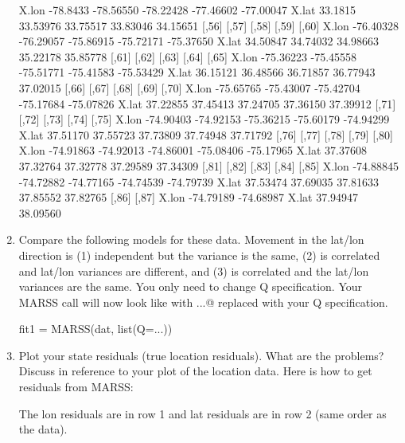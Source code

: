 \begin{hwenumerate}
\begin{enumerate}[label=\alph*)]
\begin{Schunk}
\begin{Soutput}
         [,51]     [,52]     [,53]     [,54]     [,55]
X.lon -78.8433 -78.56550 -78.22428 -77.46602 -77.00047
X.lat  33.1815  33.53976  33.75517  33.83046  34.15651
          [,56]     [,57]     [,58]     [,59]     [,60]
X.lon -76.40328 -76.29057 -75.86915 -75.72171 -75.37650
X.lat  34.50847  34.74032  34.98663  35.22178  35.85778
          [,61]     [,62]     [,63]     [,64]     [,65]
X.lon -75.36223 -75.45558 -75.51771 -75.41583 -75.53429
X.lat  36.15121  36.48566  36.71857  36.77943  37.02015
          [,66]     [,67]     [,68]     [,69]     [,70]
X.lon -75.65765 -75.43007 -75.42704 -75.17684 -75.07826
X.lat  37.22855  37.45413  37.24705  37.36150  37.39912
          [,71]     [,72]     [,73]     [,74]     [,75]
X.lon -74.90403 -74.92153 -75.36215 -75.60179 -74.94299
X.lat  37.51170  37.55723  37.73809  37.74948  37.71792
          [,76]     [,77]     [,78]     [,79]     [,80]
X.lon -74.91863 -74.92013 -74.86001 -75.08406 -75.17965
X.lat  37.37608  37.32764  37.32778  37.29589  37.34309
          [,81]     [,82]     [,83]     [,84]     [,85]
X.lon -74.88845 -74.72882 -74.77165 -74.74539 -74.79739
X.lat  37.53474  37.69035  37.81633  37.85552  37.82765
          [,86]     [,87]
X.lon -74.79189 -74.68987
X.lat  37.94947  38.09560
\end{Soutput}
\end{Schunk}
\item Compare the following models for these data.  Movement in the lat/lon direction is  (1) independent but the variance is the same, (2) is correlated and lat/lon variances are different, and (3) is correlated and the lat/lon variances are the same.  You only need to change Q specification.  Your MARSS call will now look like with \verb@...@ replaced with your Q specification.
\begin{Schunk}
\begin{Sinput}
 fit1 = MARSS(dat, list(Q=...))
\end{Sinput}
\end{Schunk}
\item Plot your state residuals (true location residuals).  What are the problems? Discuss in reference to your plot of the location data.  Here is how to get residuals from MARSS:
\begin{Schunk}
\end{Schunk}
The lon residuals are in row 1 and lat residuals are in row 2 (same order as the data).
\end{enumerate}


\end{hwenumerate}



